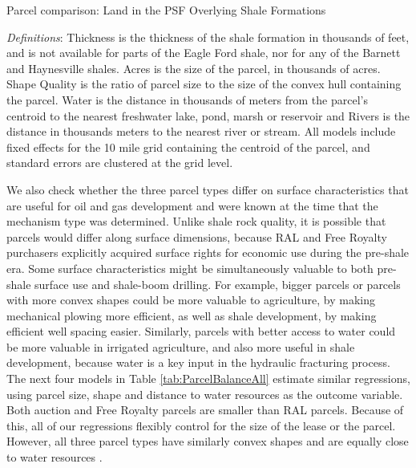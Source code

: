 \addtolength{\tabcolsep}{6pt}
\begin{table}[htpb]
	\begin{center}
	\begin{threeparttable}
	\caption{Parcel comparison: Land in the PSF Overlying Shale Formations}
	\label{tab:ParcelBalanceAll}
	\small
	       
	\footnotesize
		\begin{tablenotes}			
			\item \textit{Definitions}: Thickness is the thickness of the shale formation in thousands of feet, and is not available for parts of the Eagle Ford shale, nor for any of the Barnett and Haynesville shales. Acres is the size of the parcel, in thousands of acres.  Shape Quality is the ratio of parcel size to the size of the convex hull containing the parcel. Water is the distance in thousands of meters from the parcel's centroid to the nearest freshwater lake, pond, marsh or reservoir and Rivers is the distance in thousands meters to the nearest river or stream. All models include fixed effects for the 10 mile grid containing the centroid of the parcel, and standard errors are clustered at the grid level.  
			\end{tablenotes}
	\end{threeparttable}
	\end{center}
\end{table}
\addtolength{\tabcolsep}{-6pt}

We also check whether the three parcel types differ on surface characteristics that are useful for oil and gas development and were known at the time that the mechanism type was determined. Unlike shale rock quality, it is possible that parcels would differ along surface dimensions, because RAL and Free Royalty purchasers explicitly acquired surface rights for economic use during the pre-shale era. Some surface characteristics might be simultaneously valuable to both pre-shale surface use and shale-boom drilling.  For example, bigger parcels or parcels with more convex shapes could be more valuable to agriculture, by making mechanical plowing more efficient, as well as shale development, by making efficient well spacing easier.  Similarly, parcels with better access to water could be more valuable in irrigated agriculture, and also more useful in shale development, because water is a key input in the hydraulic fracturing process. The next four models in Table \ref{tab:ParcelBalanceAll} estimate similar regressions, using parcel size, shape and distance to water resources as the outcome variable.  Both auction and Free Royalty parcels are smaller than RAL parcels.  Because of this, all of our regressions flexibly control for the size of the lease or the parcel.  However, all three parcel types have similarly convex shapes and are equally close to water resources \citep{water}.  

